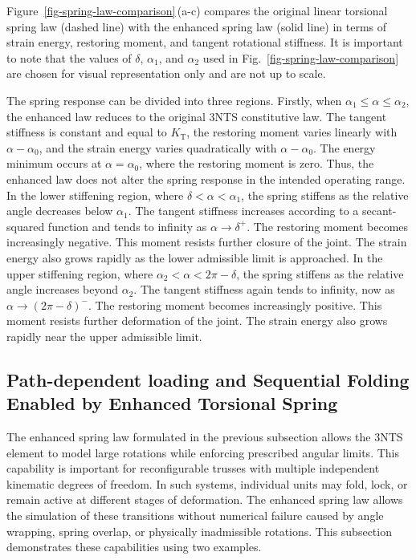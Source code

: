 Figure~\ref{fig-spring-law-comparison}\,(a-c) compares the original linear torsional spring law (dashed line) with the enhanced spring law (solid line) in terms of strain energy, restoring moment, and tangent rotational stiffness. It is important to note that the values of \(\delta\), \(\alpha_1\), and \(\alpha_2\) used in Fig.~\ref{fig-spring-law-comparison} are chosen for visual representation only and are not up to scale. 

The spring response can be divided into three regions. Firstly, when \(\alpha_1 \le \alpha \le \alpha_2\), the enhanced law reduces to the original 3NTS constitutive law. The tangent stiffness is constant and equal to \(K_\textrm{T}\), the restoring moment varies linearly with \(\alpha-\alpha_0\), and the strain energy varies quadratically with \(\alpha-\alpha_0\). The energy minimum occurs at \(\alpha=\alpha_0\), where the restoring moment is zero. Thus, the enhanced law does not alter the spring response in the intended operating range. In the lower stiffening region, where \(\delta < \alpha < \alpha_1\), the spring stiffens as the relative angle decreases below \(\alpha_1\). The tangent stiffness increases according to a secant-squared function and tends to infinity as \(\alpha \rightarrow \delta^+\). The restoring moment becomes increasingly negative. This moment resists further closure of the joint. The strain energy also grows rapidly as the lower admissible limit is approached. In the upper stiffening region, where \(\alpha_2 < \alpha < 2\pi-\delta\), the spring stiffens as the relative angle increases beyond \(\alpha_2\). The tangent stiffness again tends to infinity, now as \(\alpha \rightarrow (2\pi-\delta)^-\). The restoring moment becomes increasingly positive. This moment resists further deformation of the joint. The strain energy also grows rapidly near the upper admissible limit.

\subsection{Path-dependent loading and Sequential Folding Enabled by Enhanced Torsional Spring}\label{04-subsec-deployment-path}

The enhanced spring law formulated in the previous subsection allows the 3NTS element to model large rotations while enforcing prescribed angular limits. This capability is important for reconfigurable trusses with multiple independent kinematic degrees of freedom. In such systems, individual units may fold, lock, or remain active at different stages of deformation. The enhanced spring law allows the simulation of these transitions without numerical failure caused by angle wrapping, spring overlap, or physically inadmissible rotations. This subsection demonstrates these capabilities using two examples.

